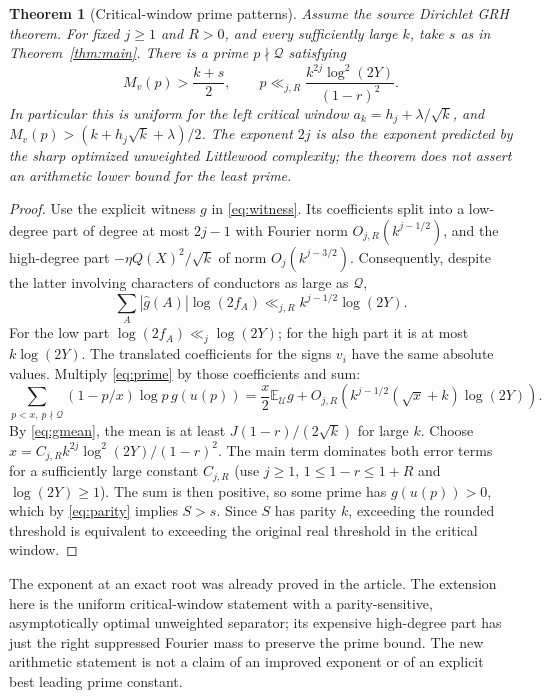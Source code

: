 \documentclass[11pt]{article}
\newtheorem{theorem}{Theorem}[section]
\theoremstyle{remark}\newtheorem{remark}[theorem]{Remark}
\newcommand{\E}{\mathbb E}
\newcommand{\U}{\mathcal U}
\begin{document}
\begin{theorem}[Critical-window prime patterns]\label{thm:prime}
Assume the source Dirichlet GRH theorem. For fixed $j\ge1$ and $R>0$, and every sufficiently large $k$, take $s$ as in Theorem~\ref{thm:main}. There is a prime $p\nmid\mathcal Q$ satisfying
\[
 M_v(p)>\frac{k+s}{2},\qquad
 p\ll_{j,R}\frac{k^{2j}\log^2(2Y)}{(1-r)^2}.
\]
In particular this is uniform for the left critical window $a_k=h_j+\lambda/\sqrt{k}$, and $M_v(p)>(k+h_j\sqrt{k}+\lambda)/2$. The exponent $2j$ is also the exponent predicted by the sharp optimized unweighted Littlewood complexity; the theorem does not assert an arithmetic lower bound for the least prime.
\end{theorem}
\begin{proof}
Use the explicit witness $g$ in \eqref{eq:witness}. Its coefficients split into a low-degree part of degree at most $2j-1$ with Fourier norm $O_{j,R}(k^{j-1/2})$, and the high-degree part $-\eta Q(X)^2/\sqrt{k}$ of norm $O_j(k^{j-3/2})$. Consequently, despite the latter involving characters of conductors as large as $\mathcal Q$,
\[
 \sum_A |\widehat g(A)|\log(2f_A)\ll_{j,R} k^{j-1/2}\log(2Y).
\]
For the low part $\log(2f_A)\ll_j\log(2Y)$; for the high part it is at most $k\log(2Y)$. The translated coefficients for the signs $v_i$ have the same absolute values. Multiply \eqref{eq:prime} by those coefficients and sum:
\[
 \sum_{p<x,\ p\nmid\mathcal Q}(1-p/x)\log p\,g(u(p))
 =\frac{x}{2}\E_\U g+O_{j,R}\left(k^{j-1/2}(\sqrt{x}+k)\log(2Y)\right).
\]
By \eqref{eq:gmean}, the mean is at least $J(1-r)/(2\sqrt{k})$ for large $k$. Choose $x=C_{j,R} k^{2j}\log^2(2Y)/(1-r)^2$. The main term dominates both error terms for a sufficiently large constant $C_{j,R}$ (use $j\ge1$, $1\le1-r\le1+R$ and $\log(2Y)\ge1$). The sum is then positive, so some prime has $g(u(p))>0$, which by \eqref{eq:parity} implies $S>s$. Since $S$ has parity $k$, exceeding the rounded threshold is equivalent to exceeding the original real threshold in the critical window.
\end{proof}

The exponent at an exact root was already proved in the article. The extension here is the uniform critical-window statement with a parity-sensitive, asymptotically optimal unweighted separator; its expensive high-degree part has just the right suppressed Fourier mass to preserve the prime bound. The new arithmetic statement is not a claim of an improved exponent or of an explicit best leading prime constant.
\end{document}
